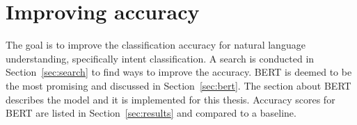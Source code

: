 \chapter{Improving accuracy}
\label{ch:improving_accuracy}

The goal is to improve the classification accuracy for natural language understanding, specifically intent classification.
A search is conducted in Section~\ref{sec:search} to find ways to improve the accuracy.
BERT is deemed to be the most promising and discussed in Section~\ref{sec:bert}.
The section about BERT describes the model and it is implemented for this thesis.
Accuracy scores for BERT are listed in Section~\ref{sec:results} and compared to a baseline.






